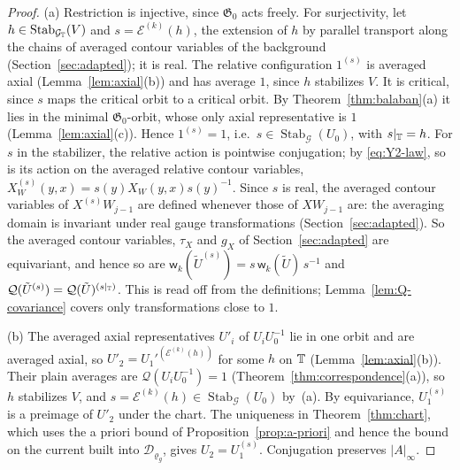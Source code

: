 \begin{proof}
(a) Restriction is injective, since $\mathfrak G_0$ acts freely. For surjectivity, let $h\in\operatorname{Stab}_{\mathcal G_\mathbb T}(V)$ and $s=\mathcal E^{(k)}(h)$, the extension of $h$ by parallel transport along the chains of averaged contour variables of the background (Section~\ref{sec:adapted}); it is real. The relative configuration $1^{(s)}$ is averaged axial (Lemma~\ref{lem:axial}(b)) and has average $1$, since $h$ stabilizes $V$. It is critical, since $s$ maps the critical orbit to a critical orbit. By Theorem~\ref{thm:balaban}(a) it lies in the minimal $\mathfrak G_0$-orbit, whose only axial representative is $1$ (Lemma~\ref{lem:axial}(c)). Hence $1^{(s)}=1$, i.e.\ $s\in\operatorname{Stab}_{\mathcal G}(U_0)$, with $s|_\mathbb T=h$. For $s$ in the stabilizer, the relative action is pointwise conjugation; by \eqref{eq:Y2-law}, so is its action on the averaged relative contour variables, $X^{(s)}_W(y,x)=s(y)X_W(y,x)s(y)^{-1}$. Since $s$ is real, the averaged contour variables of $X^{(s)}W_{j-1}$ are defined whenever those of $XW_{j-1}$ are: the averaging domain is invariant under real gauge transformations (Section~\ref{sec:adapted}). So the averaged contour variables, $\tau_X$ and $g_X$ of Section~\ref{sec:adapted} are equivariant, and hence so are $\mathsf w_k(\tilde U^{(s)})=s\,\mathsf w_k(\tilde U)\,s^{-1}$ and $\mathcal Q(\tilde U^{(s)})=\mathcal Q(\tilde U)^{(s|_\mathbb T)}$. This is read off from the definitions; Lemma~\ref{lem:Q-covariance} covers only transformations close to $1$.

(b) The averaged axial representatives $U'_i$ of $U_iU_0^{-1}$ lie in one orbit and are averaged axial, so $U'_2=U_1'^{(\mathcal E^{(k)}(h))}$ for some $h$ on $\mathbb T$ (Lemma~\ref{lem:axial}(b)). Their plain averages are $\mathcal Q(U_iU_0^{-1})=1$ (Theorem~\ref{thm:correspondence}(a)), so $h$ stabilizes $V$, and $s=\mathcal E^{(k)}(h)\in\operatorname{Stab}_{\mathcal G}(U_0)$ by~(a). By equivariance, $U_1^{(s)}$ is a preimage of $U'_2$ under the chart. The uniqueness in Theorem~\ref{thm:chart}, which uses the a priori bound of Proposition~\ref{prop:a-priori} and hence the bound on the current built into $\mathcal D_{\varrho_g}$, gives $U_2=U_1^{(s)}$. Conjugation preserves $|A|_\infty$.
\end{proof}

